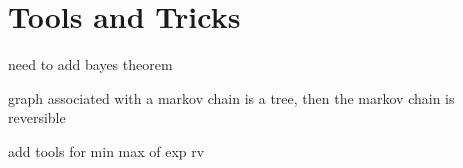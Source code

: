 \documentclass{article}
\begin{document}
\onehalfspacing


\tableofcontents

\newpage

\section{Tools and Tricks}

need to add bayes theorem

graph associated with a markov chain is a tree, then the markov chain is reversible

add tools for min max of exp rv






\end{document}
